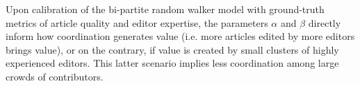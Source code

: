 Upon calibration of the bi-partite random walker model with ground-truth metrics of article quality and editor expertise, the parameters $\alpha$ and $\beta$  directly inform how coordination generates value (i.e. more articles edited by more editors brings value), or on the contrary, if value is created by small clusters of highly experienced editors. This latter scenario implies less coordination among large crowds of contributors.

%
%
%
%
